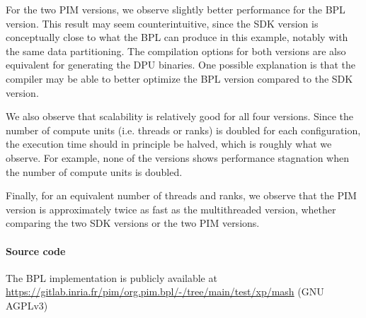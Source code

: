 For the two PIM versions, we observe slightly better performance for the BPL version. This result may seem counterintuitive, since the SDK version is conceptually close to what the BPL can produce in this example, notably with the same data partitioning. The compilation options for both versions are also equivalent for generating the DPU binaries. One possible explanation is that the compiler may be able to better optimize the BPL version compared to the SDK version.

We also observe that scalability is relatively good for all four versions. Since the number of compute units (i.e. threads or ranks) is doubled for each configuration, the execution time should in principle be halved, which is roughly what we observe. For example, none of the versions shows performance stagnation when the number of compute units is doubled.

Finally, for an equivalent number of threads and ranks, we observe that the PIM version is approximately twice as fast as the multithreaded version, whether comparing the two SDK versions or the two PIM versions.

\paragraph{Source code} The BPL implementation is publicly available at \url{https://gitlab.inria.fr/pim/org.pim.bpl/-/tree/main/test/xp/mash} (GNU AGPLv3)
